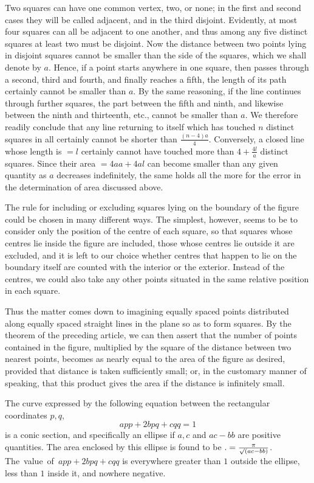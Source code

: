 Two squares can have one common vertex, two, or none; in the first and second cases they will be called adjacent, and in the third disjoint. Evidently, at most four squares can all be adjacent to one another, and thus among any five distinct squares at least two must be disjoint. Now the distance between two points lying in disjoint squares cannot be smaller than the side of the squares, which we shall denote by $a$. Hence, if a point starts anywhere in one square, then passes through a second, third and fourth, and finally reaches a fifth, the length of its path certainly cannot be smaller than $a$. By the same reasoning, if the line continues through further squares, the part between the fifth and ninth, and likewise between the ninth and thirteenth, etc., cannot be smaller than $a$. We therefore readily conclude that any line returning to itself which has touched $n$ distinct squares in all certainly cannot be shorter than $\frac{(n-4)a}4$. Conversely, a closed line whose length is $=l$ certainly cannot have touched more than $4+\frac{4l}a$ distinct squares. Since their area $=4aa+4al$ can become smaller than any given quantity as $a$ decreases indefinitely, the same holds all the more for the error in the determination of area discussed above.

The rule for including or excluding squares lying on the boundary of the figure could be chosen in many different ways. The simplest, however, seems to be to consider only the position of the centre of each square, so that squares whose centres lie inside the figure are included, those whose centres lie outside it are excluded, and it is left to our choice whether centres that happen to lie on the boundary itself are counted with the interior or the exterior. Instead of the centres, we could also take any other points situated in the same relative position in each square.

Thus the matter comes down to imagining equally spaced points distributed along equally spaced straight lines in the plane so as to form squares. By the theorem of the preceding article, we can then assert that the number of points contained in the figure, multiplied by the square of the distance between two nearest points, becomes as nearly equal to the area of the figure as desired, provided that distance is taken sufficiently small; or, in the customary manner of speaking, that this product gives the area if the distance is infinitely small.

The curve expressed by the following equation between the rectangular coordinates $p,q$,
\[
app+2bpq+cqq=1
\]
is a conic section, and specifically an ellipse if $a,c$ and $ac-bb$ are positive quantities. The area enclosed by this ellipse is found to be $\mathbin{.}=\frac\pi{\surd(ac-bb)}$. \mbox{The value of $app+2bpq+cqq$} is everywhere greater than $1$ outside the ellipse, less than $1$ inside it, and nowhere negative.

